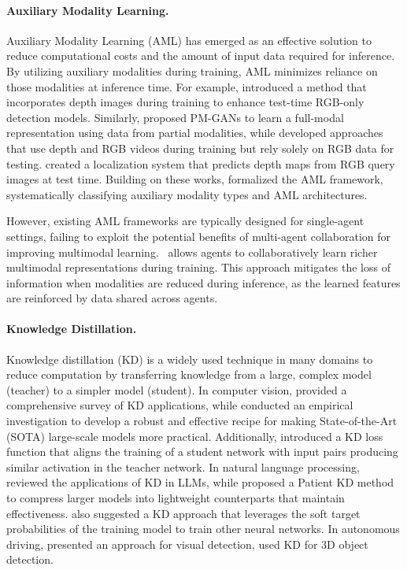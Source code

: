 \paragraph{Auxiliary Modality Learning.}
Auxiliary Modality Learning (AML) \cite{shen2023auxiliary} has emerged as an effective solution to reduce computational costs and the amount of input data required for inference. By utilizing auxiliary modalities during training, AML minimizes reliance on those modalities at inference time. For example, \citet{hoffman2016learning} introduced a method that incorporates depth images during training to enhance test-time RGB-only detection models. Similarly, \citet{wang2018pm} proposed PM-GANs to learn a full-modal representation using data from partial modalities, while \citet{garcia2018modality, garcia2019learning} developed approaches that use depth and RGB videos during training but rely solely on RGB data for testing. \citet{piasco2021improving} created a localization system that predicts depth maps from RGB query images at test time. Building on these works, \citet{shen2023auxiliary} formalized the AML framework, systematically classifying auxiliary modality types and AML architectures.

However, existing AML frameworks are typically designed for single-agent settings, failing to exploit the potential benefits of multi-agent collaboration for improving multimodal learning. \ours~allows agents to collaboratively learn richer multimodal representations during training. This approach mitigates the loss of information when modalities are reduced during inference, as the learned features are reinforced by data shared across agents.

\paragraph{Knowledge Distillation.}
Knowledge distillation (KD) \citep{hinton2015distilling} is a widely used technique in many domains to reduce computation by transferring knowledge from a large, complex model (teacher) to a simpler model (student). In computer vision, \citet{gou2021knowledge} provided a comprehensive survey of KD applications, while \citet{beyer2022knowledge} conducted an empirical investigation to develop a robust and effective recipe for making State-of-the-Art (SOTA) large-scale models more practical. Additionally, \citet{tung2019similarity} introduced a KD loss function that aligns the training of a student network with input pairs producing similar activation in the teacher network. In natural language processing, \citet{xu2024survey} reviewed the applications of KD in LLMs, while \citet{sun2019patient} proposed a Patient KD method to compress larger models into lightweight counterparts that maintain effectiveness. \citet{hahn2019self} also suggested a KD approach that leverages the soft target probabilities of the training model to train other neural networks. In autonomous driving, \citet{lan2022instance} presented an approach for visual detection, \citet{cho2023itkd, sautier2022image} used KD for 3D object detection.

